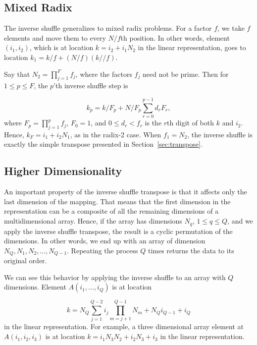 \documentclass{article}
\begin{document}
\subsection{Mixed Radix}
\label{sec:mixedradix}

The inverse shuffle generalizes to mixed radix problems.  For a factor
$f$, we take $f$ elements and move them to every $N/f$th position.  In
other words, element $(i_1,i_2)$, which is at location $k =
i_2+i_1N_2$ in the linear representation, goes to location $k_1 = k/f
+ (N/f)(k//f)$.

Say that $N_2 = \prod_{j=1}^F f_j$, where the factors $f_j$ need not
be prime.  Then for $1 \le p \le F$, the $p$'th inverse shuffle step
is

\begin{equation}\label{eqn:mixedradix}
  k_p = k/F_p + N/F_p \sum_{r=0}^{p-1} d_r F_r,
\end{equation}
%
where $F_p = \prod_{j=1}^p f_j$, $F_0 = 1$, and $0 \le d_r < f_r$ is
the $r$th digit of both $k$ and $i_2$.  Hence, $k_F = i_1 + i_2N_1$,
as in the radix-2 case.  When $f_1 = N_2$, the inverse shuffle is
exactly the simple transpose presented in Section~\ref{sec:transpose}.

\subsection{Higher Dimensionality}

An important property of the inverse shuffle transpose is that it
affects only the last dimension of the mapping.  That means that the
first dimension in the representation can be a composite of all the
remaining dimensions of a multidimensional array.  Hence, if the array
has dimensions $N_q$, $1 \le q \le Q$, and we apply the inverse
shuffle transpose, the result is a cyclic permutation of the
dimensions.  In other words, we end up with an array of dimension
$N_Q, N_1, N_2, \ldots, N_{Q-1}$.  Repeating the process $Q$ times
returns the data to its original order.

We can see this behavior by applying the inverse shuffle to an array
with $Q$ dimensions.  Element $A(i_1, \ldots, i_Q)$ is at location

\begin{equation}
  k = N_Q \sum_{j=1}^{Q-2} i_j \prod_{m=j+1}^{Q-1} N_m + N_Q i_{Q-1} + i_Q
\end{equation}
%
in the linear representation.  For example, a three dimensional array
element at $A(i_1,i_2,i_3)$ is at location $k = i_1N_3N_2 + i_2N_3 +
i_3$ in the linear representation.
\end{document}
